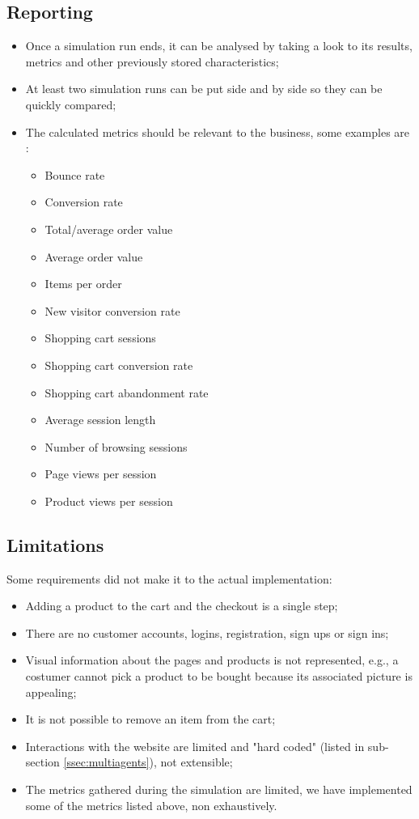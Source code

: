 \subsection{Reporting}

\begin{itemize}
    \item Once a simulation run ends, it can be analysed by taking a look to 
    its results, metrics and other previously stored characteristics;
    \item At least two simulation runs can be put side and by side so they can 
    be quickly compared;
    \item The calculated metrics should be relevant to the business, some 
    examples are \cite{Watson2015}:
    \begin{itemize}
        \item Bounce rate
        \item Conversion rate
        \item Total/average order value
        \item Average order value
        \item Items per order
        \item New visitor conversion rate
        \item Shopping cart sessions
        \item Shopping cart conversion rate
        \item Shopping cart abandonment rate
        \item Average session length
        \item Number of browsing sessions
        \item Page views per session
        \item Product views per session
    \end{itemize}
\end{itemize}

\subsection{Limitations}

Some requirements did not make it to the actual implementation:

\begin{itemize}
    \item Adding a product to the cart and the checkout is a single step;
    \item There are no customer accounts, logins, registration, sign ups or 
    sign ins;
    \item Visual information about the pages and products is not represented, 
    e.g., a costumer cannot pick a product to be bought because its associated 
    picture is appealing;
    \item It is not possible to remove an item from the cart;
    \item Interactions with the website are limited and "hard coded" (listed 
    in sub-section \ref{ssec:multiagents}), not extensible;
    \item The metrics gathered during the simulation are limited, we have 
    implemented some of the metrics listed above, non exhaustively.
\end{itemize}

